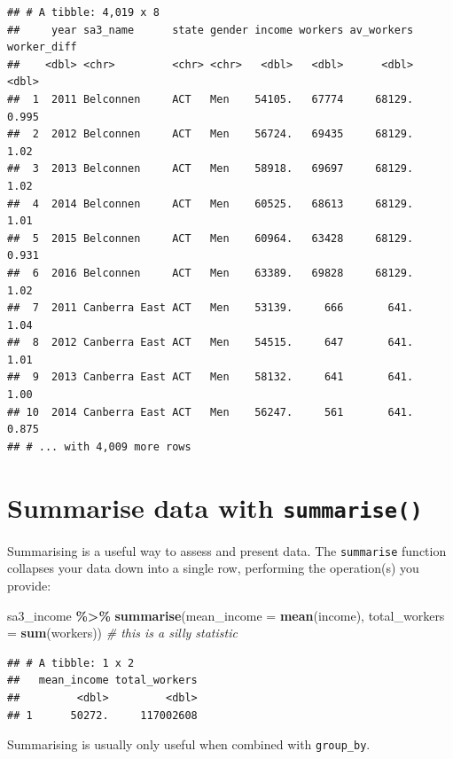 \documentclass[
]{book}
\newenvironment{Shaded}{\begin{snugshade}}{\end{snugshade}}
\newcommand{\CommentTok}[1]{\textcolor[rgb]{0.56,0.35,0.01}{\textit{#1}}}
\newcommand{\DataTypeTok}[1]{\textcolor[rgb]{0.13,0.29,0.53}{#1}}
\newcommand{\KeywordTok}[1]{\textcolor[rgb]{0.13,0.29,0.53}{\textbf{#1}}}
\newcommand{\NormalTok}[1]{#1}
\newcommand{\OperatorTok}[1]{\textcolor[rgb]{0.81,0.36,0.00}{\textbf{#1}}}
\newcommand{\StringTok}[1]{\textcolor[rgb]{0.31,0.60,0.02}{#1}}
\begin{document}
\begin{verbatim}
## # A tibble: 4,019 x 8
##     year sa3_name      state gender income workers av_workers worker_diff
##    <dbl> <chr>         <chr> <chr>   <dbl>   <dbl>      <dbl>       <dbl>
##  1  2011 Belconnen     ACT   Men    54105.   67774     68129.       0.995
##  2  2012 Belconnen     ACT   Men    56724.   69435     68129.       1.02 
##  3  2013 Belconnen     ACT   Men    58918.   69697     68129.       1.02 
##  4  2014 Belconnen     ACT   Men    60525.   68613     68129.       1.01 
##  5  2015 Belconnen     ACT   Men    60964.   63428     68129.       0.931
##  6  2016 Belconnen     ACT   Men    63389.   69828     68129.       1.02 
##  7  2011 Canberra East ACT   Men    53139.     666       641.       1.04 
##  8  2012 Canberra East ACT   Men    54515.     647       641.       1.01 
##  9  2013 Canberra East ACT   Men    58132.     641       641.       1.00 
## 10  2014 Canberra East ACT   Men    56247.     561       641.       0.875
## # ... with 4,009 more rows
\end{verbatim}

\hypertarget{summarise-data-with-summarise}{%
\section{\texorpdfstring{Summarise data with \texttt{summarise()}}{Summarise data with summarise()}}\label{summarise-data-with-summarise}}

Summarising is a useful way to assess and present data. The \texttt{summarise} function collapses your data down into a single row, performing the operation(s) you provide:

\begin{Shaded}
\begin{Highlighting}[]
\NormalTok{sa3\_income }\OperatorTok{\%\textgreater{}\%}\StringTok{ }
\StringTok{  }\KeywordTok{summarise}\NormalTok{(}\DataTypeTok{mean\_income =} \KeywordTok{mean}\NormalTok{(income),}
            \DataTypeTok{total\_workers =} \KeywordTok{sum}\NormalTok{(workers))  }\CommentTok{\# this is a silly statistic}
\end{Highlighting}
\end{Shaded}

\begin{verbatim}
## # A tibble: 1 x 2
##   mean_income total_workers
##         <dbl>         <dbl>
## 1      50272.     117002608
\end{verbatim}

Summarising is usually only useful when combined with \texttt{group\_by}.
\end{document}
